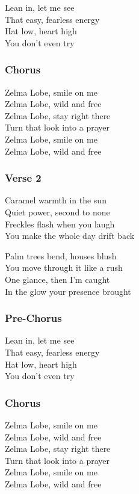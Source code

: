 Lean in, let me see\\
That easy, fearless energy\\
Hat low, heart high\\
You don't even try

\subsubsection{Chorus}\label{chorus-55}

Zelma Lobe, smile on me\\
Zelma Lobe, wild and free\\
Zelma Lobe, stay right there\\
Turn that look into a prayer\\
Zelma Lobe, smile on me\\
Zelma Lobe, wild and free

\subsubsection{Verse 2}\label{verse-2-25}

Caramel warmth in the sun\\
Quiet power, second to none\\
Freckles flash when you laugh\\
You make the whole day drift back

Palm trees bend, houses blush\\
You move through it like a rush\\
One glance, then I'm caught\\
In the glow your presence brought

\subsubsection{Pre-Chorus}\label{pre-chorus-32}

Lean in, let me see\\
That easy, fearless energy\\
Hat low, heart high\\
You don't even try

\subsubsection{Chorus}\label{chorus-56}

Zelma Lobe, smile on me\\
Zelma Lobe, wild and free\\
Zelma Lobe, stay right there\\
Turn that look into a prayer\\
Zelma Lobe, smile on me\\
Zelma Lobe, wild and free

